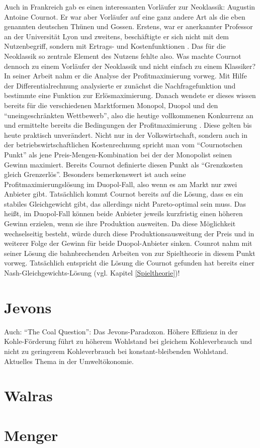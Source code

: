 Auch in Frankreich gab es einen interessanten Vorläufer zur Neoklassik: Augustin Antoine Cournot. Er war aber Vorläufer auf eine ganz andere Art als die eben genannten deutschen Thünen und Gossen. Erstens, war er anerkannter Professor an der Universität Lyon und zweitens, beschäftigte er sich nicht mit dem Nutzenbegriff, sondern mit Ertrags- und Kostenfunktionen \parencite[S. 287f]{Rosner2012}. Das für die Neoklassik so zentrale Element des Nutzens fehlte also. Was machte Cournot dennoch zu einem Vorläufer der Neoklassik und nicht einfach zu einem Klassiker? In seiner Arbeit \textcite{Cournot1838} nahm er die Analyse der Profitmaximierung vorweg. Mit Hilfe der Differentialrechnung analysierte er zunächst die Nachfragefunktion und bestimmte eine Funktion zur Erlösmaximierung. Danach wendete er dieses wissen bereits für die verschiedenen Marktformen Monopol, Duopol und den "`uneingeschränkten Wettbewerb"', also die heutige vollkommenen Konkurrenz an und ermittelte bereits die Bedingungen der Profitmaximierung \parencite[S. 289]{Rosner2012}. Diese gelten bis heute praktisch unverändert. Nicht nur in der Volkswirtschaft, sondern auch in der betriebswirtschaftlichen Kostenrechnung spricht man vom "`Cournotschen Punkt"' als jene Preis-Mengen-Kombination bei der der Monopolist seinen Gewinn maximiert. Bereits Cournot definierte diesen Punkt als "`Grenzkosten gleich Grenzerlös"'. Besonders bemerkenswert ist auch seine Profitmaximierungslösung im Duopol-Fall, also wenn es am Markt nur zwei Anbieter gibt. Tatsächlich kommt Cournot bereits auf die Lösung, dass es ein stabiles Gleichgewicht gibt, das allerdings nicht Pareto-optimal sein muss. Das heißt, im Duopol-Fall können beide Anbieter jeweils kurzfristig einen höheren Gewinn erzielen, wenn sie ihre Produktion ausweiten. Da diese Möglichkeit wechselseitig besteht, würde durch diese Produktionsausweitung der Preis und in weiterer Folge der Gewinn für beide Duopol-Anbieter sinken. Counrot nahm mit seiner Lösung die bahnbrechenden Arbeiten von \textcite{Nash1950} zur Spieltheorie in diesem Punkt vorweg. Tatsächlich entspricht die Lösung die Cournot gefunden hat bereits einer Nash-Gleichgewichts-Lösung (vgl. Kapitel \ref{Spieltheorie})!


\section{Jevons}
\label{Jevons}

Auch: "`The Coal Question"': Das Jevons-Paradoxon. Höhere Effizienz in der Kohle-Förderung führt zu höherem Wohlstand bei gleichem Kohleverbrauch und nicht zu geringerem Kohleverbrauch bei konstant-bleibenden Wohlstand. Aktuelles Thema in der Umweltökonomie.


\section{Walras}
\label{Walras}

\section{Menger}
\label{Wiener Schule}

